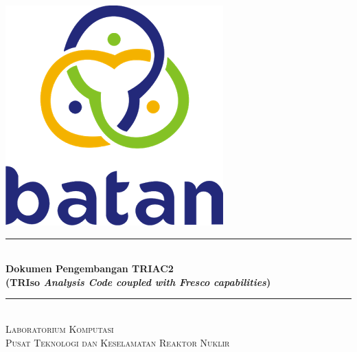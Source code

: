 \begin{titlepage}

\newcommand{\HRule}{\rule{\linewidth}{0.5mm}} %

\center %



\includegraphics[scale=.25]{pics/logo.png}\\[1cm] %


\HRule \\[0.4cm]
{ \huge \bfseries Dokumen Pengembangan TRIAC2 \\ (TRIso \textit{Analysis Code coupled with Fresco capabilities})}\\[0.4cm] %
\HRule \\[1.5cm]

\textsc{Laboratorium Komputasi}\\[0.25cm] %
\textsc{\Large Pusat Teknologi dan Keselamatan Reaktor Nuklir}\\[1.5cm] %


\end{titlepage}
